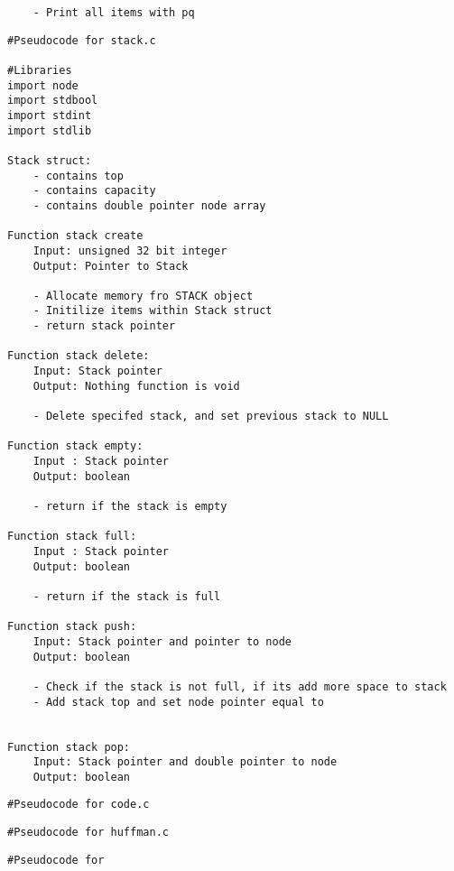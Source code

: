 \documentclass[11pt]{article} %
\begin{document}
\begin{flushleft}
\begin{lstlisting}
    - Print all items with pq  
\end{lstlisting}

\begin{lstlisting}
#Pseudocode for stack.c

#Libraries
import node
import stdbool
import stdint
import stdlib

Stack struct:
    - contains top
    - contains capacity
    - contains double pointer node array

Function stack create 
    Input: unsigned 32 bit integer 
    Output: Pointer to Stack

    - Allocate memory fro STACK object
    - Initilize items within Stack struct
    - return stack pointer

Function stack delete:
    Input: Stack pointer 
    Output: Nothing function is void

    - Delete specifed stack, and set previous stack to NULL

Function stack empty:
    Input : Stack pointer
    Output: boolean
    
    - return if the stack is empty
     
Function stack full:
    Input : Stack pointer
    Output: boolean
    
    - return if the stack is full

Function stack push:
    Input: Stack pointer and pointer to node
    Output: boolean
    
    - Check if the stack is not full, if its add more space to stack
    - Add stack top and set node pointer equal to 


Function stack pop:
    Input: Stack pointer and double pointer to node
    Output: boolean
\end{lstlisting}

\begin{lstlisting}
#Pseudocode for code.c

\end{lstlisting}
\begin{lstlisting}
#Pseudocode for huffman.c

\end{lstlisting}

\begin{lstlisting}
#Pseudocode for 

\end{lstlisting}
\end{flushleft}
\end{document}
